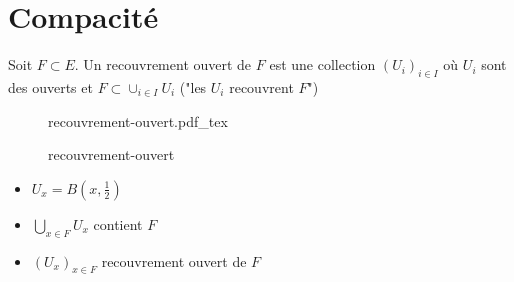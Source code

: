 \documentclass[a4paper]{report}
\theoremstyle{definition}
\newcommand{\incfig}[1]{%
    \def\svgwidth{\columnwidth}
    {#1.pdf_tex}
}
\begin{document}
\section{Compacité}
\begin{definition}
   Soit $F \subset E$. Un recouvrement ouvert de $F$ est une collection  $(U_i)_{i \in I}$ où $U_i$ sont des ouverts et $F \subset \cup_{i \in I} U_i$ ("les $U_i$ recouvrent  $F$")
\end{definition}
\begin{eg}
\begin{figure}[H]
    \centering
    \incfig{recouvrement-ouvert}
    \caption{recouvrement-ouvert}
    \label{fig:recouvrement-ouvert}
\end{figure}
\begin{itemize}
    \item $U_x = B(x, \frac{1}{2})$
    \item $\bigcup_{x \in F} U_x$ contient $F$
    \item  $(U_x)_{x \in F}$ recouvrement ouvert de $F$
\end{itemize}
\end{eg}
\end{document}
